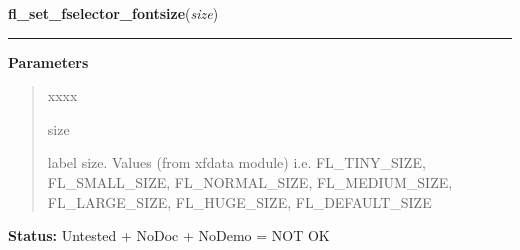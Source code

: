 \hspace{.8\funcindent}\begin{boxedminipage}{\funcwidth}

    \raggedright \textbf{fl\_set\_fselector\_fontsize}(\textit{size})

    \vspace{-1.5ex}

    \rule{\textwidth}{0.5\fboxrule}
\setlength{\parskip}{2ex}
\setlength{\parskip}{1ex}
      \textbf{Parameters}
      \vspace{-1ex}

      \begin{quote}
        \begin{Ventry}{xxxx}

          \item[size]

          label size. Values (from xfdata module) i.e. FL\_TINY\_SIZE, 
          FL\_SMALL\_SIZE, FL\_NORMAL\_SIZE, FL\_MEDIUM\_SIZE, 
          FL\_LARGE\_SIZE, FL\_HUGE\_SIZE, FL\_DEFAULT\_SIZE

        \end{Ventry}

      \end{quote}

\textbf{Status:} Untested + NoDoc + NoDemo = NOT OK



    \end{boxedminipage}

    \label{xformslib:flgoodies:fl_set_fselector_fontstyle}

    \vspace{0.5ex}

